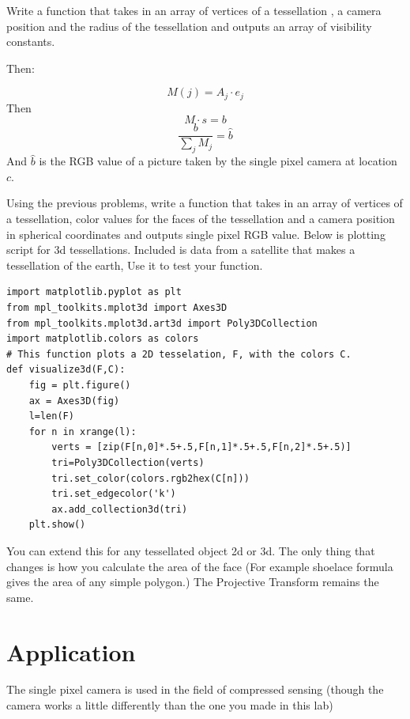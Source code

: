 \begin{problem}
Write a function that takes in an array of vertices of a tessellation , a camera position and the radius of the tessellation and outputs an array of visibility constants.
\end{problem}
Then:

\begin{equation}
M(j) = A_j \cdot e_j
\end{equation}
Then
\begin{equation}
M \cdot s = b
\end{equation}
\begin{equation}
\frac{b}{\sum_j M_j} = \hat{b}
\end{equation}
And $\hat{b}$ is the RGB value of a picture taken by the single pixel camera at location $c$.

\begin{problem}
Using the previous problems, write a function that takes in an array of vertices of a tessellation, color values for the faces of the tessellation and a camera position in spherical coordinates and outputs single pixel RGB value. Below is plotting script for 3d tessellations. Included is data from a satellite that makes a tessellation of the earth, Use it to test your function.
\end{problem}

\begin{lstlisting}
import matplotlib.pyplot as plt
from mpl_toolkits.mplot3d import Axes3D
from mpl_toolkits.mplot3d.art3d import Poly3DCollection
import matplotlib.colors as colors
# This function plots a 2D tesselation, F, with the colors C. 
def visualize3d(F,C):
    fig = plt.figure()
    ax = Axes3D(fig)
    l=len(F)
    for n in xrange(l):
        verts = [zip(F[n,0]*.5+.5,F[n,1]*.5+.5,F[n,2]*.5+.5)]
        tri=Poly3DCollection(verts)
        tri.set_color(colors.rgb2hex(C[n]))
        tri.set_edgecolor('k')
        ax.add_collection3d(tri)
    plt.show()
\end{lstlisting}


You can extend this for any tessellated object 2d or 3d. The only thing that changes is how you calculate the area of the face (For example shoelace formula gives the area of any simple polygon.) The Projective Transform remains the same. 

\section*{Application}
The single pixel camera is used in the field of compressed sensing (though the camera works a little differently than the one you made in this lab)
